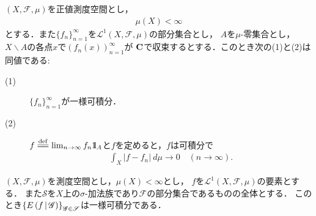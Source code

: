 	\begin{screen}
	\begin{thm}[一様可積分性と平均収束]\label{lem:uniformly_integrable_and_convergence_in_mean}
		$(X,\mathscr{F},\mu)$を正値測度空間とし，
		\begin{align}
			\mu(X) < \infty
		\end{align}
		とする．また$\{f_n\}_{n=1}^\infty$を$\mathscr{L}^1(X,\mathscr{F},\mu)$の部分集合とし，
		$A$を$\mu$-零集合とし，$X \backslash A$の各点$x$で$(f_n(x))_{n=1}^\infty$が
		$\mathbf{C}$で収束するとする．このとき次の(1)と(2)は同値である:
		\begin{description}
			\item[(1)] $\{f_n\}_{n=1}^\infty$が一様可積分．
			\item[(2)] $f \defeq \lim_{n \to \infty} f_n \defunc_A$と$f$を定めると，$f$は可積分で
				\begin{align}
					\int_X |f - f_n|\ d\mu 
					\longrightarrow 0
					\quad (n \longrightarrow \infty).
				\end{align}
		\end{description}
	\end{thm}
	\end{screen}
	
	\begin{screen}
	\begin{thm}[一様可積分性と条件付き期待値]\label{lem:uniformly_integrability_and_conditional_expectations}
		$(X,\mathscr{F},\mu)$を測度空間とし，$\mu(X) < \infty$とし，
		$f$を$\mathscr{L}^1(X,\mathscr{F},\mu)$の要素とする．
		また$\mathscr{S}$を$X$上の$\sigma$-加法族であり$\mathscr{F}$の部分集合であるものの全体とする．
		このとき$\left\{ E\left( f \, \middle|\, \mathscr{G} \right) \right\}_{\mathscr{G} \in \mathscr{S}}$は一様可積分である．
	\end{thm}
	\end{screen}
	

